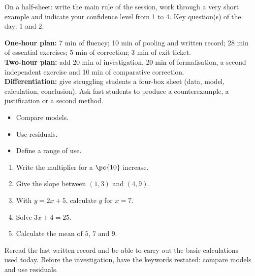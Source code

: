 \begin{exitticket}[3 minutes]On a half-sheet: write the main rule of the session, work through a very short example and indicate your confidence level from 1 to 4. Key question(s) of the day: 1 and 2.\end{exitticket}

\ifmxteacher
\begin{method}
\textbf{One-hour plan:} 7 min of fluency; 10 min of pooling and written record; 28 min of essential exercises; 5 min of correction; 3 min of exit ticket.\\
\textbf{Two-hour plan:} add 20 min of investigation, 20 min of formalisation, a second independent exercise and 10 min of comparative correction.\\
\textbf{Differentiation:} give struggling students a four-box sheet (data, model, calculation, conclusion). Ask fast students to produce a counterexample, a justification or a second method.
\end{method}
\fi
{}
\begin{objectives}\begin{itemize}\item Compare models.\item Use residuals.\item Define a range of use.\end{itemize}\end{objectives}
\begin{fluency}\begin{enumerate}\item Write the multiplier for a $\pc{10}$ increase. \item Give the slope between $(1,3)$ and $(4,9)$. \item With $y=2x+5$, calculate $y$ for $x=7$. \item Solve $3x+4=25$. \item Calculate the mean of $5$, $7$ and $9$. \end{enumerate}\end{fluency}
\begin{prerequisites}Reread the last written record and be able to carry out the basic calculations used today. Before the investigation, have the keywords restated: compare models and use residuals.\end{prerequisites}


